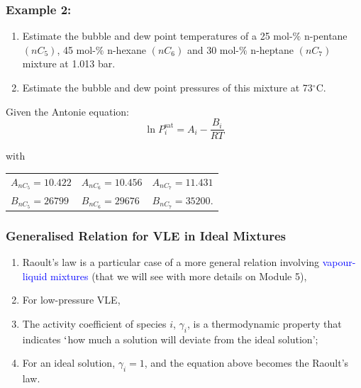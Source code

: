 \documentclass[10pt,compress,handout]{beamer}
\newcommand{\frc}{\displaystyle\frac}
\begin{document}
\begin{frame} %
  \frametitle{Example 2:}
    \begin{enumerate}
        \item Estimate the bubble and dew point temperatures of a 25 mol-$\%$ n-pentane $\left(nC_{5}\right)$, 45 mol-$\%$ n-hexane $\left(nC_{6}\right)$ and 30 mol-$\%$ n-heptane $\left(nC_{7}\right)$ mixture at 1.013 bar. 
        \item  Estimate the bubble and dew point pressures of this mixture at 73$^{\circ}$C.
    \end{enumerate}
    Given the Antonie equation:
    \begin{displaymath}
       \ln P_{i}^{\text{sat}} = A_{i} - \frc{B_{i}}{RT}
    \end{displaymath}

    with
    \begin{center}
       \begin{tabular}{l l l} 
          $A_{nC_{5}}=10.422$ & $A_{nC_{6}}=10.456$ & $A_{nC_{7}}=11.431$ \\
          $B_{nC_{5}}=26799$  & $B_{nC_{6}}=29676$  & $B_{nC_{7}}=35200$.
       \end{tabular}
    \end{center}
\end{frame}
\normalsize

\begin{frame}
  \frametitle{Generalised Relation for VLE in Ideal Mixtures}
  \begin{enumerate}
      \item<1-> Raoult's law is a particular case of a more general relation involving \textcolor{blue}{vapour-liquid mixtures} (that we will see with more details on Module 5),
      \item<3-> For low-pressure VLE,
      \item<4-> The activity  coefficient of species $i$, $\gamma_{i}$, is a thermodynamic property that indicates $\lq$how much a solution will deviate from the ideal solution';
      \item<4-> For an ideal solution, $\gamma_{i}=1$, and the equation above becomes the Raoult's law.  
  \end{enumerate}
\end{frame}
\end{document}
